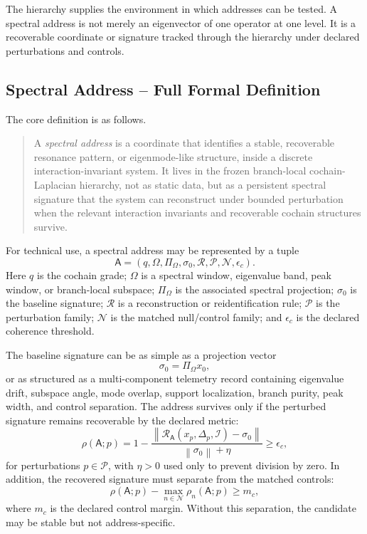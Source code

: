 \documentclass[11pt]{article}
\begin{document}
The hierarchy supplies the environment in which addresses can be tested. A spectral address is not merely an eigenvector of one operator at one level. It is a recoverable coordinate or signature tracked through the hierarchy under declared perturbations and controls.

\subsection{Spectral Address -- Full Formal Definition}

The core definition is as follows.

\begin{quote}
A \emph{spectral address} is a coordinate that identifies a stable, recoverable resonance pattern, or eigenmode-like structure, inside a discrete interaction-invariant system. It lives in the frozen branch-local cochain-Laplacian hierarchy, not as static data, but as a persistent spectral signature that the system can reconstruct under bounded perturbation when the relevant interaction invariants and recoverable cochain structures survive.
\end{quote}

For technical use, a spectral address may be represented by a tuple
\[
\mathsf{A}
=
\left(
q,\Omega,\Pi_{\Omega},\sigma_0,\mathcal{R},\mathcal{P},\mathcal{N},\epsilon_c
\right).
\]
Here \(q\) is the cochain grade; \(\Omega\) is a spectral window, eigenvalue band, peak window, or branch-local subspace; \(\Pi_{\Omega}\) is the associated spectral projection; \(\sigma_0\) is the baseline signature; \(\mathcal{R}\) is a reconstruction or reidentification rule; \(\mathcal{P}\) is the perturbation family; \(\mathcal{N}\) is the matched null/control family; and \(\epsilon_c\) is the declared coherence threshold.

The baseline signature can be as simple as a projection vector
\[
\sigma_0=\Pi_{\Omega}x_0,
\]
or as structured as a multi-component telemetry record containing eigenvalue drift, subspace angle, mode overlap, support localization, branch purity, peak width, and control separation. The address survives only if the perturbed signature remains recoverable by the declared metric:
\[
\rho(\mathsf{A};p)
=
1-
\frac{
\left\|
\mathcal{R}_{\mathsf{A}}\!\left(x_p,\Delta_p,\mathcal{I}\right)
-\sigma_0
\right\|
}{
\left\|\sigma_0\right\|+\eta
}
\geq \epsilon_c,
\]
for perturbations \(p\in\mathcal{P}\), with \(\eta>0\) used only to prevent division by zero. In addition, the recovered signature must separate from the matched controls:
\[
\rho(\mathsf{A};p)-\max_{n\in\mathcal{N}}\rho_n(\mathsf{A};p)
\geq m_c,
\]
where \(m_c\) is the declared control margin. Without this separation, the candidate may be stable but not address-specific.
\end{document}
